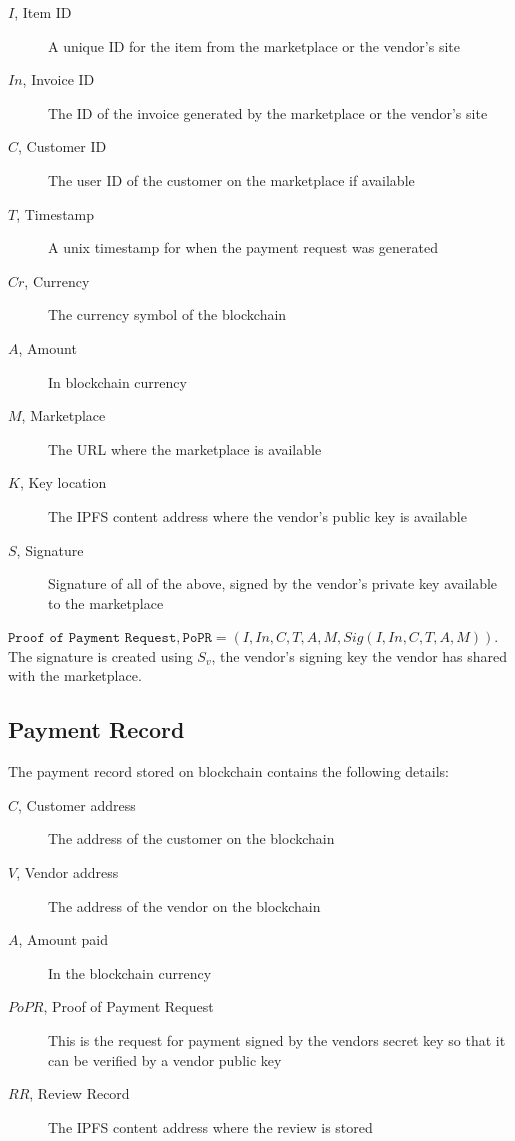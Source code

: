 \documentclass[a4paper]{article}
\begin{document}
\begin{description}
\item[$I$, Item ID] A unique ID for the item from the marketplace or the vendor's site
\item[$In$, Invoice ID] The ID of the invoice generated by the marketplace or the vendor's site
\item[$C$, Customer ID] The user ID of the customer on the marketplace if available
\item[$T$, Timestamp] A unix timestamp for when the payment request was generated
\item[$Cr$, Currency] The currency symbol of the blockchain
\item[$A$, Amount] In blockchain currency 
\item[$M$, Marketplace] The URL where the marketplace is available
\item[$K$, Key location] The IPFS content address where the vendor's public key is available
\item[$S$, Signature] Signature of all of the above, signed by the vendor's private key available to the marketplace
\end{description}

$\texttt{Proof of Payment Request}, \texttt{PoPR} = (I, In, C, T, A,
M, Sig(I,In,C, T, A, M))$. The signature is created using $S_v$, the
vendor's signing key the vendor has shared with the marketplace.


\subsection{Payment Record}

The payment record stored on blockchain contains the following
details:

\begin{description}
\item[$C$, Customer address] The address of the customer on the
  blockchain
\item[$V$, Vendor address] The address of the vendor on the blockchain
\item[$A$, Amount paid] In the blockchain currency
\item[$PoPR$, Proof of Payment Request] This is the request for
  payment signed by the vendors secret key so that it can be verified
  by a vendor public key
\item[$RR$, Review Record] The IPFS content address where the review is
  stored
\end{description}
\end{document}
